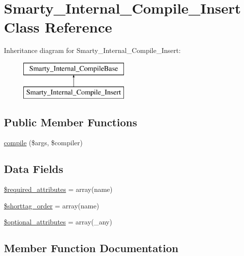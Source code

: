 \hypertarget{class_smarty___internal___compile___insert}{}\section{Smarty\+\_\+\+Internal\+\_\+\+Compile\+\_\+\+Insert Class Reference}
\label{class_smarty___internal___compile___insert}
Inheritance diagram for Smarty\+\_\+\+Internal\+\_\+\+Compile\+\_\+\+Insert\+:\begin{figure}[H]
\begin{center}
\leavevmode
\includegraphics[height=2.000000cm]{class_smarty___internal___compile___insert}
\end{center}
\end{figure}
\subsection*{Public Member Functions}
\begin{DoxyCompactItemize}
\item 
\hyperlink{class_smarty___internal___compile___insert_ad72fac0effa74aadee9b5ef6aed5f69f}{compile} (\$args, \$compiler)
\end{DoxyCompactItemize}
\subsection*{Data Fields}
\begin{DoxyCompactItemize}
\item 
\hyperlink{class_smarty___internal___compile___insert_ae799507d5461de485f3a618abeecea95}{\$required\+\_\+attributes} = array(\textquotesingle{}name\textquotesingle{})
\item 
\hyperlink{class_smarty___internal___compile___insert_a2ccb25269c3a92e8c4796c7ef23725e6}{\$shorttag\+\_\+order} = array(\textquotesingle{}name\textquotesingle{})
\item 
\hyperlink{class_smarty___internal___compile___insert_a899d1eb4a6fecbd6ce696adb171c80a4}{\$optional\+\_\+attributes} = array(\textquotesingle{}\+\_\+any\textquotesingle{})
\end{DoxyCompactItemize}


\subsection{Member Function Documentation}
\hypertarget{class_smarty___internal___compile___insert_ad72fac0effa74aadee9b5ef6aed5f69f}{}

